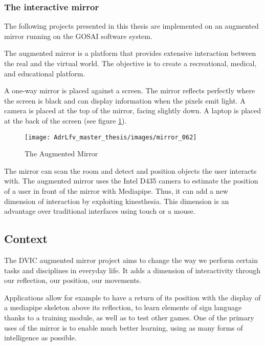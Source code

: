 \subsubsection{The interactive mirror}

The following projects presented in this thesis are implemented on an augmented mirror running on the GOSAI software system.

The augmented mirror is a platform that provides extensive interaction between the real and the virtual world. The objective is to create a recreational, medical, and educational platform.

A one-way mirror is placed against a screen. The mirror reflects perfectly where the screen is black and can display information when the pixels emit light. A camera is placed at the top of the mirror, facing slightly down. A laptop is placed at the back of the screen (see figure \ref{fig:mirror_062}).

\begin{figure}[h]
    \centering
    \texttt{[image: AdrLfv\_master\_thesis/images/mirror\_062]}
    \caption{The Augmented Mirror}
    \label{fig:mirror_062}
\end{figure}


The mirror can scan the room and detect and position objects the user interacts with. The augmented mirror uses the Intel D435 camera to estimate the position of a user in front of the mirror with Mediapipe. Thus, it can add a new dimension of interaction by exploiting kinesthesia. This dimension is an advantage over traditional interfaces using touch or a mouse. 

\subsection{Context}

The DVIC augmented mirror project aims to change the way we perform certain tasks and disciplines in everyday life.
It adds a dimension of interactivity through our reflection, our position, our movements.

Applications allow for example to have a return of its position with the display of a mediapipe skeleton above its reflection, to learn elements of sign language thanks to a training module, as well as to test other games. One of the primary uses of the mirror is to enable much better learning, using as many forms of intelligence as possible.

